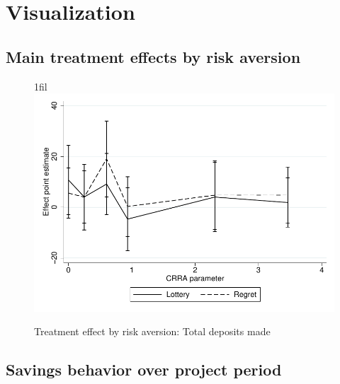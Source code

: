 \documentclass[11pt]{article}
\makeatletter
\newcommand*{\centerfloat}{%
  \parindent \z@
  \leftskip \z@ \@plus 1fil \@minus \textwidth
  \rightskip\leftskip
  \parfillskip \z@skip}
\makeatother
\begin{document}
    \clearpage

\section{Visualization}

	\subsection{Main treatment effects by risk aversion}

		\begin{figure}[h]
		\centering
		\caption{Treatment effect by risk aversion: Total deposits made}
		\centerfloat
		\includegraphics[width=\textwidth]{../../figures/line-mobile_totdepositsbyrisk.pdf}
		\end{figure}

	\clearpage

	\subsection{Savings behavior over project period}
\end{document}
